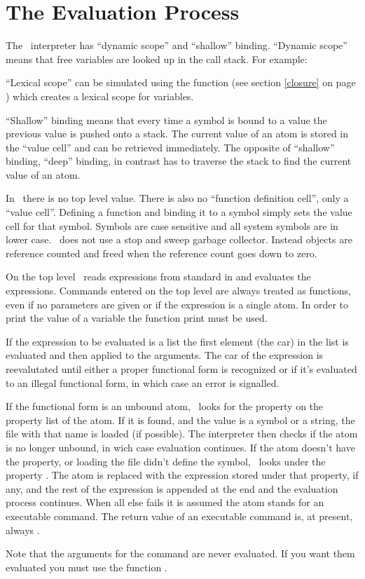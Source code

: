 \section{The Evaluation Process}
The \lips\ interpreter has ``dynamic scope'' and ``shallow'' binding.
``Dynamic scope'' means that free variables are looked up in the call
stack. For example:


``Lexical scope'' can be simulated using the  function
(see section \ref{closure} on page \pageref{closure}) which creates a
lexical scope for variables.

``Shallow'' binding means that every time a symbol is bound to a value
the previous value is pushed onto a stack.  The current value of an
atom is stored in the ``value cell'' and can be retrieved immediately.
The opposite of ``shallow'' binding, ``deep'' binding, in contrast has
to traverse the stack to find the current value of an atom.

In \lips\ there is no top level value.  There is also no ``function
definition cell'', only a ``value cell''.  Defining a function and
binding it to a symbol simply sets the value cell for that symbol.
Symbols are case sensitive and all system symbols are in lower case.
\lips\ does not use a stop and sweep garbage collector.  Instead
objects are reference counted and freed when the reference count goes
down to zero.

On the top level \lips\ reads expressions from standard in and
evaluates the expressions.  Commands entered on the top level are
always treated as functions, even if no parameters are given or if the
expression is a single atom.  In order to print the value of a
variable the function print must be used.

If the expression to be evaluated is a list the first element (the
car) in the list is evaluated and then applied to the arguments.  The
car of the expression is reevalutated until either a proper functional
form is recognized or if it's evaluated to an illegal functional form,
in which case an error is signalled.

If the functional form is an unbound atom, \lips\ looks for the
property  on the property list of the atom.  If it is
found, and the value is a symbol or a string, the file with that name
is loaded (if possible).  The interpreter then checks if the atom is
no longer unbound, in wich case evaluation continues.  If the atom
doesn't have the  property, or loading the file didn't
define the symbol, \lips\ looks under the property .  The
atom is replaced with the expression stored under that property, if
any, and the rest of the expression is appended at the end and the
evaluation process continues.  When all else fails it is assumed the
atom stands for an executable command.  The return value of an
executable command is, at present, always \T.

Note that the arguments for the command are never evaluated.  If you
want them evaluated you must use the function .
